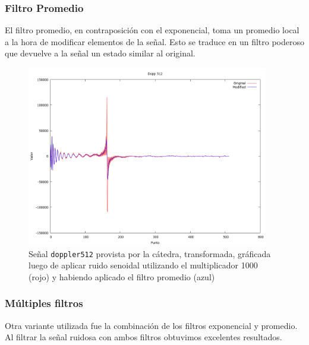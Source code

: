\subsubsection{Filtro Promedio}

El filtro promedio, en contraposici\'on con el exponencial, toma un promedio
local a la hora de modificar elementos de la se\~nal. Esto se traduce en un
filtro poderoso que devuelve a la se\~nal un estado similar al original.

\begin{figure}
\begin {center}
\includegraphics[width=299pt]{imagenes/dopp512-sin100-avg-spec.png}
\end {center}
\caption{Se\~nal \texttt{doppler512} provista por la c\'atedra, transformada, gr\'aficada
luego de aplicar ruido senoidal utilizando el multiplicador 1000 (rojo) y 
habiendo aplicado el filtro promedio (azul)}
\label{fig:SinProm}
\end{figure}

\subsubsection{M\'ultiples filtros}

Otra variante utilizada fue la combinaci\'on de los filtros exponencial y
promedio. Al filtrar la se\~nal ruidosa con ambos filtros obtuvimos excelentes
resultados.

